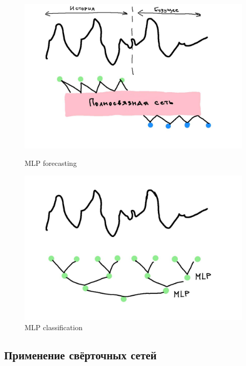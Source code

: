 \documentclass[12pt,fleqn]{article}
\begin{document}
\begin{figure}[!htb]
    \centering
    \begin{minipage}{0.45\linewidth}
        \centering
        \includegraphics[width=\linewidth]{illustrations/mlp-forecasting.jpg}
        \caption{MLP forecasting}
        \label{fig:mlp-forecasting}
    \end{minipage}
    \begin{minipage}{0.45\linewidth}
        \centering
        \includegraphics[width=\linewidth]{illustrations/mlp-clf.jpg}
        \caption{MLP classification}
        \label{fig:mlp-classification}
    \end{minipage}
\end{figure}


\subsection{Применение свёрточных сетей}
\end{document}
